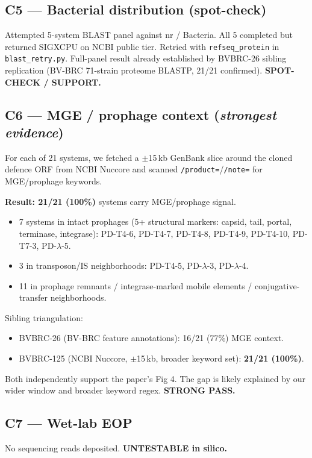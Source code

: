 \documentclass[11pt]{article}
\begin{document}
\subsection*{C5 --- Bacterial distribution (spot-check)}
Attempted 5-system BLAST panel against nr / Bacteria. All 5 completed but returned SIGXCPU on NCBI public tier. Retried with \verb|refseq_protein| in \verb|blast_retry.py|. Full-panel result already established by BVBRC-26 sibling replication (BV-BRC 71-strain proteome BLASTP, 21/21 confirmed).  \textbf{SPOT-CHECK / SUPPORT.}

\subsection*{C6 --- MGE / prophage context (\emph{strongest evidence})}
For each of 21 systems, we fetched a $\pm$15\,kb GenBank slice around the cloned defence ORF from NCBI Nuccore and scanned \verb|/product=|/\verb|/note=| for MGE/prophage keywords.

\textbf{Result: 21/21 (100\%)} systems carry MGE/prophage signal.
\begin{itemize}
  \item 7 systems in intact prophages (5+ structural markers: capsid, tail, portal, terminase, integrase): PD-T4-6, PD-T4-7, PD-T4-8, PD-T4-9, PD-T4-10, PD-T7-3, PD-$\lambda$-5.
  \item 3 in transposon/IS neighborhoods: PD-T4-5, PD-$\lambda$-3, PD-$\lambda$-4.
  \item 11 in prophage remnants / integrase-marked mobile elements / conjugative-transfer neighborhoods.
\end{itemize}

Sibling triangulation:
\begin{itemize}
  \item BVBRC-26 (BV-BRC feature annotations): 16/21 (77\%) MGE context.
  \item BVBRC-125 (NCBI Nuccore, $\pm$15\,kb, broader keyword set): \textbf{21/21 (100\%)}.
\end{itemize}
Both independently support the paper's Fig 4. The gap is likely explained by our wider window and broader keyword regex.  \textbf{STRONG PASS.}

\subsection*{C7 --- Wet-lab EOP}
No sequencing reads deposited. \textbf{UNTESTABLE in silico.}
\end{document}
